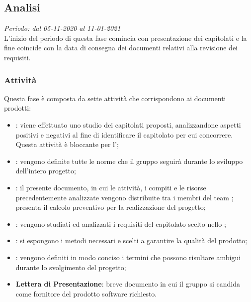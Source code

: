 \subsection{Analisi}
\textit{Periodo: dal 05-11-2020 al 11-01-2021}\\
L'inizio del periodo di questa fase comincia con presentazione dei capitolati e la fine coincide con la data di consegna dei documenti relativi alla revisione dei requisiti.
\subsubsection{Attività}
Questa fase è composta da sette attività che corrispondono ai documenti prodotti:
\begin{itemize}
\item \textbf{\SdF}: viene effettuato uno studio dei capitolati proposti, analizzandone aspetti positivi e negativi al fine di identificare il capitolato per cui concorrere. Questa attività è bloccante per l'\AdR ;
\item \textbf{\NdP}: vengono definite tutte le norme che il gruppo \Gruppo seguirà durante lo sviluppo dell'intero progetto;
\item \textbf{\PdP}: il presente documento, in cui le attività, i compiti\glo{} e le risorse precedentemente analizzate vengono distribuite tra i membri del team \Gruppo{}; presenta il calcolo preventivo per la realizzazione del progetto;
\item \textbf{\AdR}: vengono studiati ed analizzati i requisiti del capitolato\glo{} scelto nello \SdF;
\item \textbf{\PdQ}: si espongono i metodi necessari e scelti a garantire la qualità del prodotto;
\item \textbf{\Glossario}: vengono definiti in modo conciso i termini che possono risultare ambigui durante lo svolgimento del progetto;
\item \textbf{Lettera di Presentazione}: breve documento in cui il gruppo \Gruppo{} si candida come fornitore del prodotto software richiesto.
\end{itemize}
